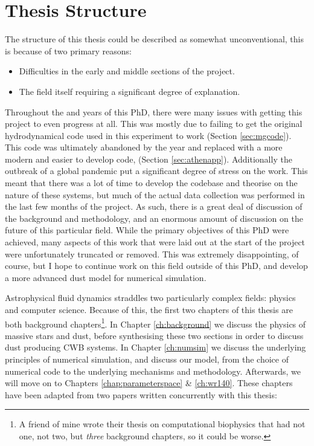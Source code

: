 \section{Thesis Structure}

The structure of this thesis could be described as somewhat unconventional, this is because of two primary reasons:

\begin{itemize}
  \item Difficulties in the early and middle sections of the project.
  \item The field itself requiring a significant degree of explanation.
\end{itemize}

\noindent
Throughout the  and  years of this PhD, there were many issues with getting this project to even progress at all.
This was mostly due to failing to get the original hydrodynamical code used in this experiment to work (Section \ref{sec:mgcode}).
This code was ultimately abandoned by the  year and replaced with a more modern and easier to develop code, \athena{} (Section \ref{sec:athenapp}).
Additionally the outbreak of a global pandemic put a significant degree of stress on the work.
This meant that there was a lot of time to develop the codebase and theorise on the nature of these systems, but much of the actual data collection was performed in the last few months of the project.
As such, there is a great deal of discussion of the background and methodology, and an enormous amount of discussion on the future of this particular field.
While the primary objectives of this PhD were achieved, many aspects of this work that were laid out at the start of the project were unfortunately truncated or removed.
This was extremely disappointing, of course, but I hope to continue work on this field outside of this PhD, and develop a more advanced dust model for numerical simulation.

Astrophysical fluid dynamics straddles two particularly complex fields: physics and computer science.
Because of this, the first two chapters of this thesis are both background chapters\footnote{A friend of mine wrote their thesis on computational biophysics that had not one, not two, but \emph{three} background chapters, so it could be worse.}.
In Chapter \ref{ch:background} we discuss the physics of massive stars and dust, before synthesising these two sections in order to discuss dust producing CWB systems.
In Chapter \ref{ch:numsim} we discuss the underlying principles of numerical simulation, and discuss our model, from the choice of numerical code to the underlying mechanisms and methodology.
Afterwards, we will move on to Chapters \ref{chap:parameterspace} \& \ref{ch:wr140}.
These chapters have been adapted from two papers written concurrently with this thesis:

